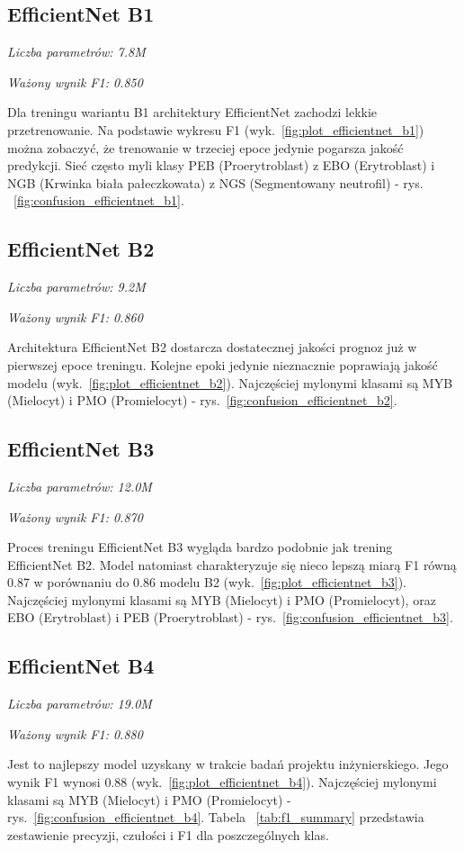\subsection{EfficientNet B1}
\textit{Liczba parametrów: 7.8M}

\textit{Ważony wynik F1: 0.850}

Dla treningu wariantu B1 architektury EfficientNet zachodzi lekkie przetrenowanie.
Na podstawie wykresu F1 (wyk.~\ref{fig:plot_efficientnet_b1}) można zobaczyć, że trenowanie w trzeciej epoce jedynie pogarsza jakość predykcji.
Sieć często myli klasy PEB (Proerytroblast) z EBO (Erytroblast) i NGB (Krwinka biała pałeczkowata) z NGS (Segmentowany neutrofil) - rys. ~\ref{fig:confusion_efficientnet_b1}.

\subsection{EfficientNet B2}
\textit{Liczba parametrów: 9.2M}

\textit{Ważony wynik F1: 0.860}

Architektura EfficientNet B2 dostarcza dostatecznej jakości prognoz już w pierwszej epoce treningu.
Kolejne epoki jedynie nieznacznie poprawiają jakość modelu (wyk.~\ref{fig:plot_efficientnet_b2}).
Najczęściej mylonymi klasami są MYB (Mielocyt) i PMO (Promielocyt) - rys.~\ref{fig:confusion_efficientnet_b2}.

\subsection{EfficientNet B3}
\textit{Liczba parametrów: 12.0M}

\textit{Ważony wynik F1: 0.870}

Proces treningu EfficientNet B3 wygląda bardzo podobnie jak trening EfficientNet B2. Model natomiast charakteryzuje się nieco lepszą miarą F1 równą 0.87 w porównaniu do 0.86 modelu B2 (wyk.~\ref{fig:plot_efficientnet_b3}). Najczęściej mylonymi klasami są MYB (Mielocyt) i PMO (Promielocyt), oraz EBO (Erytroblast) i PEB (Proerytroblast) - rys.~\ref{fig:confusion_efficientnet_b3}.

\subsection{EfficientNet B4}
\textit{Liczba parametrów: 19.0M}

\textit{Ważony wynik F1: 0.880}

Jest to najlepszy model uzyskany w trakcie badań projektu inżynierskiego.
Jego wynik F1 wynosi 0.88 (wyk.~\ref{fig:plot_efficientnet_b4}). Najczęściej mylonymi klasami są MYB (Mielocyt) i PMO (Promielocyt) - rys.~\ref{fig:confusion_efficientnet_b4}.
Tabela ~\ref{tab:f1_summary} przedstawia zestawienie precyzji, czułości i F1 dla poszczególnych klas.

